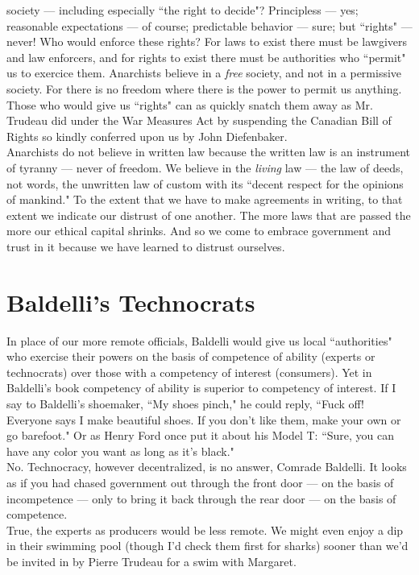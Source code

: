 \noindent society --- including especially ``the right to decide"? Principless --- yes; reasonable expectations --- of course; predictable behavior --- sure; but ``rights" --- never! Who would enforce these rights? For laws to exist there must be lawgivers and law enforcers, and for rights to exist there must be authorities who ``permit" us to exercice them. Anarchists believe in a \emph{free} society, and not in a permissive society. For there is no freedom where there is the power to permit us anything. Those who would give us ``rights" can as quickly snatch them away as Mr. Trudeau did under the War Measures Act by suspending the Canadian Bill of Rights so kindly conferred upon us by John Diefenbaker.\\
Anarchists do not believe in written law because the written law is an instrument of tyranny --- never of freedom. We believe in the \emph{living} law --- the law of deeds, not words, the unwritten law of custom with its ``decent respect for the opinions of mankind." To the extent that we have to make agreements in writing, to that extent we indicate our distrust of one another. The more laws that are passed the more our ethical capital shrinks. And so we come to embrace government and trust in it because we have learned to distrust ourselves.

\section*{Baldelli's Technocrats}
In place of our more remote officials, Baldelli would give us local ``authorities" who exercise their powers on the basis of competence of ability (experts or technocrats) over those with a competency of interest (consumers). Yet in Baldelli's book competency of ability is superior to competency of interest. If I say to Baldelli's shoemaker, ``My shoes pinch," he could reply, ``Fuck off! Everyone says I make beautiful shoes. If you don't like them, make your own or go barefoot." Or as Henry Ford once put it about his Model T: ``Sure, you can have any color you want as long as it's black."\\
No. Technocracy, however decentralized, is no answer, Comrade Baldelli. It looks as if you had chased government out through the front door --- on the basis of incompetence --- only to bring it back through the rear door --- on the basis of competence.\\
True, the experts as producers would be less remote. We might even enjoy a dip in their swimming pool (though I'd check them first for sharks) sooner than we'd be invited in by Pierre Trudeau for a swim with Margaret.


